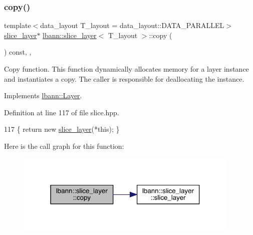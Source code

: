\subsubsection{\texorpdfstring{copy()}{copy()}}
{\footnotesize\ttfamily template$<$data\+\_\+layout T\+\_\+layout = data\+\_\+layout\+::\+D\+A\+T\+A\+\_\+\+P\+A\+R\+A\+L\+L\+EL$>$ \\
\hyperlink{classlbann_1_1slice__layer}{slice\+\_\+layer}$\ast$ \hyperlink{classlbann_1_1slice__layer}{lbann\+::slice\+\_\+layer}$<$ T\+\_\+layout $>$\+::copy (\begin{DoxyParamCaption}{ }\end{DoxyParamCaption}) const\hspace{0.3cm}{\ttfamily [inline]}, {\ttfamily [override]}, {\ttfamily [virtual]}}

Copy function. This function dynamically allocates memory for a layer instance and instantiates a copy. The caller is responsible for deallocating the instance. 

Implements \hyperlink{classlbann_1_1Layer_af420f22bbac801c85483ade84588a23f}{lbann\+::\+Layer}.



Definition at line 117 of file slice.\+hpp.


\begin{DoxyCode}
117 \{ \textcolor{keywordflow}{return} \textcolor{keyword}{new} \hyperlink{classlbann_1_1slice__layer_a248cf99da690964ac0209684f8c13c1d}{slice\_layer}(*\textcolor{keyword}{this}); \}
\end{DoxyCode}
Here is the call graph for this function\+:\nopagebreak
\begin{figure}[H]
\begin{center}
\leavevmode
\includegraphics[width=303pt]{classlbann_1_1slice__layer_a8c2b93a3ed24b239cc429ee85ee7ef29_cgraph}
\end{center}
\end{figure}
\mbox{\label{classlbann_1_1slice__layer_a4ade139cc44a7de47761680e1d44cb08}} 
